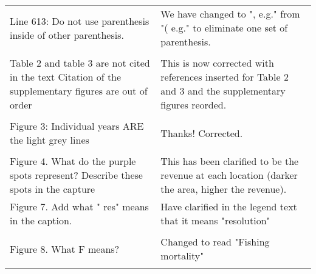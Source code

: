 \documentclass[10pt]{letter}
\begin{document}
\begin{landscape}
\begin{center}
\begin{longtable}{p{12cm} | p{12cm}}
\\
Line 613: Do not use parenthesis inside of other parenthesis. & We have changed
to ", e.g." from "( e.g." to eliminate one set of parenthesis. \\
\\
Table 2 and table 3 are not cited in the text Citation of the supplementary
figures are out of order & This is now corrected with references inserted for
Table 2 and 3 and the supplementary figures reorded. \\
\\
Figure 3: Individual years ARE the light grey lines    & Thanks! Corrected. \\
\\
Figure 4. What do the purple spots represent? Describe these spots in the
capture & This has been clarified to be the revenue at each location (darker
the area, higher the revenue). \\
Figure 7. Add what " res"  means in the caption.  & Have clarified in the
legend text that it means "resolution" \\
\\
Figure 8. What F means? & Changed to read "Fishing mortality" \\
\\
		\bottomrule
	\end{longtable}

\end{center}

\end{landscape}
\end{document}
